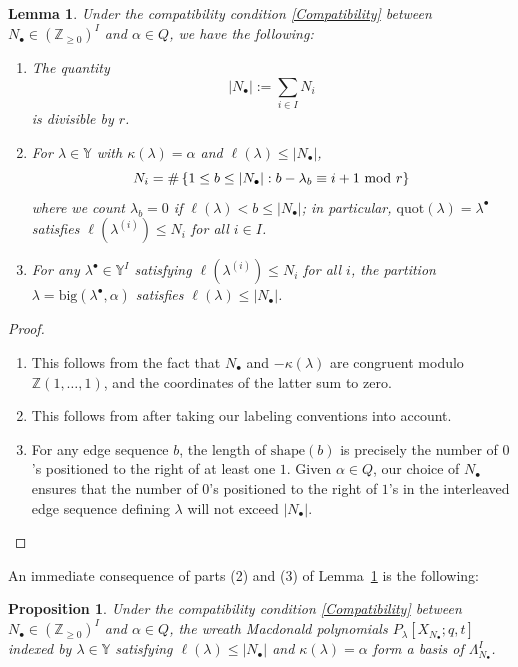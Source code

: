 \documentclass{amsart}
\newcommand{\Z}{\mathbb{Z}}
\newcommand{\Y}{\mathbb{Y}}
\newcommand{\kb}{\kappa}
\newcommand{\shape}{\mathrm{shape}}
\newtheorem{lem}[thm]{Lemma}
\newtheorem{prop}[thm]{Proposition}
\theoremstyle{remark}
\numberwithin{thm}{section}
\numberwithin{equation}{section}
\begin{document}
\begin{lem}\label{SumR}
Under the compatibility condition \eqref{Compatibility} between $N_\bullet\in(\Z_{\ge 0})^I$ and $\alpha\in Q$, 
we have the following:
\begin{enumerate}
\item The quantity
\[|N_\bullet|:=\sum_{i\in I}N_i\]
is divisible by $r$.
\item For $\lambda\in\Y$ with $\kb(\lambda)=\alpha$ and $\ell(\lambda)\le |N_\bullet|$,
\[
N_i=\#\left\{ 1\le b\le |N_\bullet| :  b-\lambda_b\equiv i+1\hbox{ mod }r \right\}
\]
where we count $\lambda_b=0$ if $\ell(\lambda)<b\le|N_\bullet|$; in particular, $\mathrm{quot}(\lambda)=\lambda^\bullet$ satisfies $\ell(\lambda^{(i)})\leq N_i$ for all $i\in I$.
\item For any $\lambda^\bullet\in\Y^I$ satisfying $\ell(\lambda^{(i)})\leq N_i$ for all $i$, the partition $\lambda=\mathrm{big}(\lambda^\bullet,\alpha)$ satisfies $\ell(\lambda)\le |N_\bullet|$.
\end{enumerate} 
\end{lem}

\begin{proof}
\begin{enumerate}
    \item This follows from the fact that $N_\bullet$ and $-\kb(\lambda)$ are congruent modulo $\Z(1,\dotsc,1)$, and the coordinates of the latter sum to zero.
    \item This follows from \cite[I.1, Ex. 8]{Mac} after taking our labeling conventions into account.
    \item For any edge sequence $b$, the length of $\shape(b)$ is precisely the number of $0$'s positioned to the right of at least one $1$. Given $\alpha\in Q$, our choice of $N_\bullet$ ensures that the number of $0$'s positioned to the right of $1$'s in the interleaved edge sequence defining $\lambda$ will not exceed $|N_\bullet|$.\qedhere
\end{enumerate}
\end{proof}

An immediate consequence of parts (2) and (3) of Lemma~\ref{SumR} is the following:

\begin{prop}\label{Basis}
Under the compatibility condition \eqref{Compatibility} between $N_\bullet\in (\Z_{\ge 0})^I$ and $\alpha\in Q$, the wreath Macdonald polynomials $P_\lambda[X_{N_\bullet};q,t]$ indexed by $\lambda\in \Y$ satisfying $\ell(\lambda)\le |N_\bullet|$ and $\kb(\lambda)=\alpha$ form a basis of $\Lambda^I_{N_\bullet}$.
\end{prop}
\end{document}
